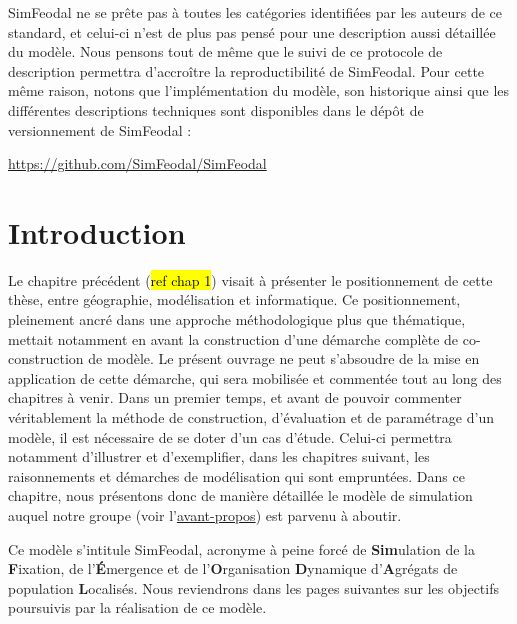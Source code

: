 \begin{mdframed}[backgroundcolor=black!5,footnoteinside=false]
\noindent SimFeodal ne se prête pas à toutes les catégories identifiées par les auteurs de ce standard, et celui-ci n'est de plus pas pensé pour une description aussi détaillée du modèle.
Nous pensons tout de même que le suivi de ce protocole de description permettra d'accroître la reproductibilité de SimFeodal.
Pour cette même raison, notons que l'implémentation du modèle, son historique ainsi que les différentes descriptions techniques sont disponibles dans le dépôt de versionnement de SimFeodal :
\begin{center}
	\href{https://github.com/SimFeodal/SimFeodal}{https://github.com/SimFeodal/SimFeodal}
\end{center}

\end{mdframed}

\clearpage


\clearpage


\section*{Introduction}
\label{sec:chap2-intro}

Le chapitre précédent (\hl{ref chap 1}) visait à présenter le positionnement de cette thèse, entre géographie, modélisation et informatique.
Ce positionnement, pleinement ancré dans une approche méthodologique plus que thématique, mettait notamment en avant la construction d'une démarche complète de co-construction de modèle.
Le présent ouvrage ne peut s'absoudre de la mise en application de cette démarche, qui sera mobilisée et commentée tout au long des chapitres à venir.
Dans un premier temps, et avant de pouvoir commenter véritablement la méthode de construction, d'évaluation et de paramétrage d'un modèle, il est nécessaire de se doter d'un cas d'étude.
Celui-ci permettra notamment d'illustrer et d'exemplifier, dans les chapitres suivant, les raisonnements et démarches de modélisation qui sont empruntées.
Dans ce chapitre, nous présentons donc de manière détaillée le modèle de simulation auquel notre groupe (voir l'\hyperlink{avant-propos}{avant-propos}) est parvenu à aboutir.

Ce modèle s'intitule SimFeodal, acronyme à peine forcé de \og \textbf{Sim}ulation de la \textbf{F}ixation, de l'\textbf{É}mergence et de l'\textbf{O}rganisation \textbf{D}ynamique d'\textbf{A}grégats de population \textbf{L}ocalisés\fg{}.
Nous reviendrons dans les pages suivantes sur les objectifs poursuivis par la réalisation de ce modèle.

